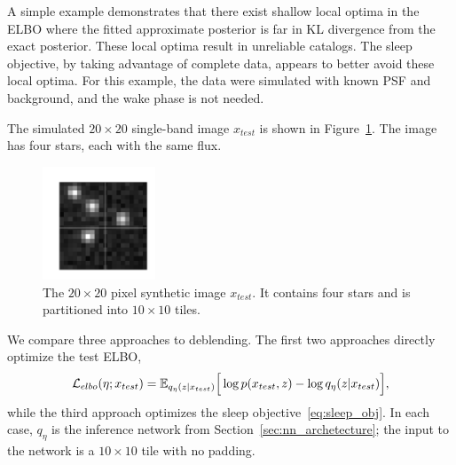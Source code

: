 

\label{sec:elbo_sleep_compare}

A simple example demonstrates that there exist shallow local optima in the ELBO
where the fitted approximate posterior is far in KL divergence from the exact posterior. 
These local optima result in unreliable catalogs. 
The sleep objective, by taking advantage of  complete data, appears to better avoid these local optima. 
For this example, the data were simulated with known PSF and background, and the wake phase is not needed. 

The simulated $20\times20$ single-band image $x_{test}$ is shown in Figure~\ref{fig:toy_example}.
The image has four stars, each with the same flux. 

\begin{figure}[!h]
    \centering
    \vspace{-1em}
    \includegraphics[width = 0.3\textwidth]{figures/elbo_vs_sleep/vi_sleep_ex_figure.png}
    \vspace{-1.7em}
    \caption{The $20\times 20$ pixel synthetic image $x_{test}$. It contains four stars and is partitioned into $10\times 10$ tiles. }
    \label{fig:toy_example}
\end{figure}

We compare three approaches to deblending. The first two approaches directly optimize the test ELBO, 
\begin{align}
\mathcal{L}_{elbo}(\eta; x_{test}) = \mathbb{E}_{q_{\eta}(z | x_{test})}\Big[\log p(x_{test}, z) - \log q_{\eta}(z | x_{test})\Big],
\label{eq:elbo_on_test}
\end{align}
while the third approach optimizes the sleep objective~\eqref{eq:sleep_obj}. 
In each case, $q_\eta$ is the inference network from Section~\ref{sec:nn_archetecture}; the input to the network is a $10\times 10$ tile with no padding. 


